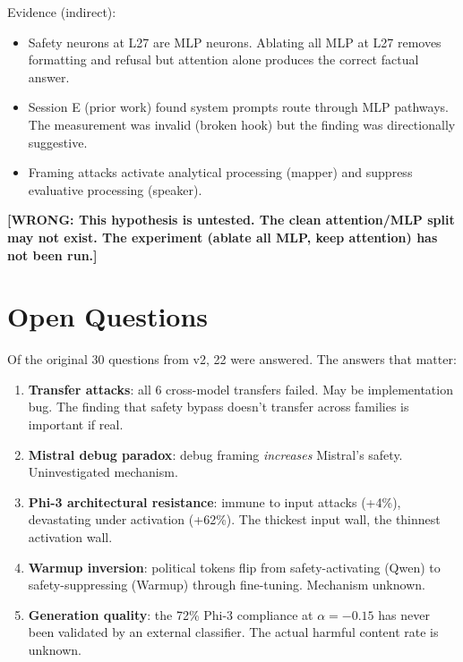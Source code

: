 \documentclass[11pt,a4paper]{article}
\newcommand{\wrong}[1]{\textcolor{wrong}{\textbf{[WRONG: #1]}}}
\begin{document}
Evidence (indirect):
\begin{itemize}[nosep]
\item Safety neurons at L27 are MLP neurons. Ablating all MLP at L27 removes formatting and refusal but attention alone produces the correct factual answer.
\item Session E (prior work) found system prompts route through MLP pathways. The measurement was invalid (broken hook) but the finding was directionally suggestive.
\item Framing attacks activate analytical processing (mapper) and suppress evaluative processing (speaker).
\end{itemize}

\wrong{This hypothesis is untested. The clean attention/MLP split may not exist. The experiment (ablate all MLP, keep attention) has not been run.}

\section{Open Questions}

Of the original 30 questions from v2, 22 were answered. The answers that matter:

\begin{enumerate}[nosep]
\item \textbf{Transfer attacks}: all 6 cross-model transfers failed. May be implementation bug. The finding that safety bypass doesn't transfer across families is important if real.
\item \textbf{Mistral debug paradox}: debug framing \textit{increases} Mistral's safety. Uninvestigated mechanism.
\item \textbf{Phi-3 architectural resistance}: immune to input attacks (+4\%), devastating under activation (+62\%). The thickest input wall, the thinnest activation wall.
\item \textbf{Warmup inversion}: political tokens flip from safety-activating (Qwen) to safety-suppressing (Warmup) through fine-tuning. Mechanism unknown.
\item \textbf{Generation quality}: the 72\% Phi-3 compliance at $\alpha=-0.15$ has never been validated by an external classifier. The actual harmful content rate is unknown.
\end{enumerate}

\end{document}
